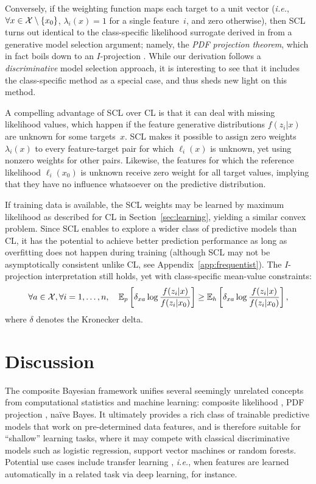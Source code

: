 \documentclass[english]{scrartcl}
\newcommand{\E}{\mathbb{E}}
\begin{document}
Conversely, if the weighting function maps each target to a unit vector ({\em i.e.}, $\forall x\in{\cal X}\setminus \{x_0\}$, $\lambda_i(x)=1$ for a single feature~$i$, and zero otherwise), then SCL turns out identical to the class-specific likelihood surrogate derived in \cite{Baggenstoss-03} from a generative model selection argument; namely, the {\em PDF projection theorem}, which in fact boils down to an $I$-projection \cite{Minka-04}. While our derivation follows a {\em discriminative} model selection approach, it is interesting to see that it includes the class-specific method as a special case, and thus sheds new light on this method.

A compelling advantage of SCL over CL is that it can deal with missing likelihood values, which happen if the feature generative distributions $f(z_i|x)$ are unknown for some targets~$x$. SCL makes it possible to assign zero weights $\lambda_i(x)$ to every feature-target pair for which $\ell_i(x)$ is unknown, yet using nonzero weights for other pairs. Likewise, the features for which the reference likelihood $\ell_i(x_0)$ is unknown receive zero weight for all target values, implying that they have no influence whatsoever on the predictive distribution.

If training data is available, the SCL weights may be learned by maximum likelihood as described for CL in Section~\ref{sec:learning}, yielding a similar convex problem. Since SCL enables to explore a wider class of predictive models than CL, it has the potential to achieve better prediction performance as long as overfitting does not happen during training (although SCL may not be asymptotically consistent unlike CL, see Appendix~\ref{app:frequentist}). The $I$-projection interpretation still holds, yet with class-specific mean-value constraints:
$$
\forall a\in{\cal X}, \forall i=1,\ldots,n,
\quad
\E_p\left[\delta_{xa}\log \frac{f(z_i|x)}{f(z_i|x_0)}\right]
\geq \E_h\left[\delta_{xa}\log \frac{f(z_i|x)}{f(z_i|x_0)}\right],
$$
where $\delta$ denotes the Kronecker delta. 




\section{Discussion}
\label{sec:discussion}

The composite Bayesian framework unifies several seemingly unrelated concepts from computational statistics and machine learning: composite likelihood \cite{Varin-11}, PDF projection \cite{Baggenstoss-03}, na\"ive Bayes. It ultimately provides a rich class of trainable predictive models that work on pre-determined data features, and is therefore suitable for ``shallow'' learning tasks, where it may compete with classical discriminative models such as logistic regression, support vector machines or random forests. Potential use cases include transfer learning \cite{Goodfellow-16}, {\em i.e.}, when features are learned automatically in a related task via deep learning, for instance.
\end{document}
